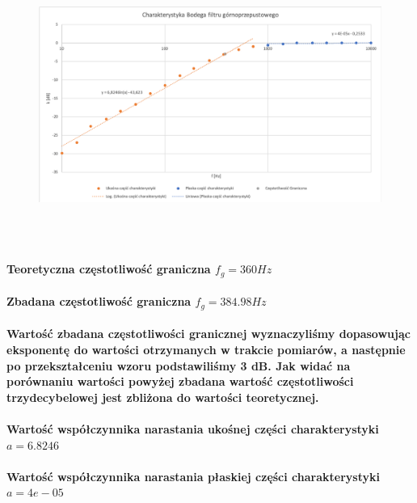 \documentclass[a4paper,12pt]{article}
\begin{document}
\begin{justify}
\begin{figure}[h]
\centering
\includegraphics[width=15cm, height=9cm]{1_wykr}
\end{figure}

\paragraph{Teoretyczna częstotliwość graniczna $f_{g} = 360Hz$}
\paragraph{Zbadana częstotliwość graniczna $f_{g} = 384.98Hz$}

\paragraph{Wartość zbadana częstotliwości granicznej wyznaczyliśmy dopasowując eksponentę do wartości otrzymanych w trakcie pomiarów, a następnie po przekształceniu wzoru podstawiliśmy 3 dB. Jak widać na porównaniu wartości powyżej zbadana wartość częstotliwości trzydecybelowej jest zbliżona do wartości teoretycznej.}

\paragraph{Wartość współczynnika narastania ukośnej części charakterystyki $a = 6.8246$}
\paragraph{Wartość współczynnika narastania płaskiej części charakterystyki $a = 4e-05$}


\end{justify}
\end{document}
